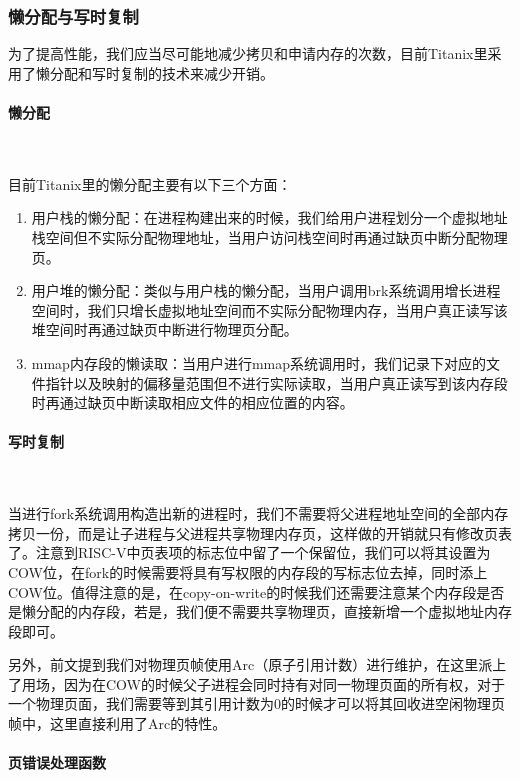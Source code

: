 \subsubsection{懒分配与写时复制}

为了提高性能，我们应当尽可能地减少拷贝和申请内存的次数，目前Titanix里采用了懒分配和写时复制的技术来减少开销。

\paragraph{懒分配}~{}

目前Titanix里的懒分配主要有以下三个方面：
\begin{enumerate}
    \item 用户栈的懒分配：在进程构建出来的时候，我们给用户进程划分一个虚拟地址栈空间但不实际分配物理地址，当用户访问栈空间时再通过缺页中断分配物理页。
    \item 用户堆的懒分配：类似与用户栈的懒分配，当用户调用brk系统调用增长进程空间时，我们只增长虚拟地址空间而不实际分配物理内存，当用户真正读写该堆空间时再通过缺页中断进行物理页分配。
    \item mmap内存段的懒读取：当用户进行mmap系统调用时，我们记录下对应的文件指针以及映射的偏移量范围但不进行实际读取，当用户真正读写到该内存段时再通过缺页中断读取相应文件的相应位置的内容。
\end{enumerate}

\paragraph{写时复制}~{}

当进行fork系统调用构造出新的进程时，我们不需要将父进程地址空间的全部内存拷贝一份，而是让子进程与父进程共享物理内存页，这样做的开销就只有修改页表了。注意到RISC-V中页表项的标志位中留了一个保留位，我们可以将其设置为COW位，在fork的时候需要将具有写权限的内存段的写标志位去掉，同时添上COW位。值得注意的是，在copy-on-write的时候我们还需要注意某个内存段是否是懒分配的内存段，若是，我们便不需要共享物理页，直接新增一个虚拟地址内存段即可。

另外，前文提到我们对物理页帧使用Arc（原子引用计数）进行维护，在这里派上了用场，因为在COW的时候父子进程会同时持有对同一物理页面的所有权，对于一个物理页面，我们需要等到其引用计数为0的时候才可以将其回收进空闲物理页帧中，这里直接利用了Arc的特性。

\paragraph{页错误处理函数}~{}

